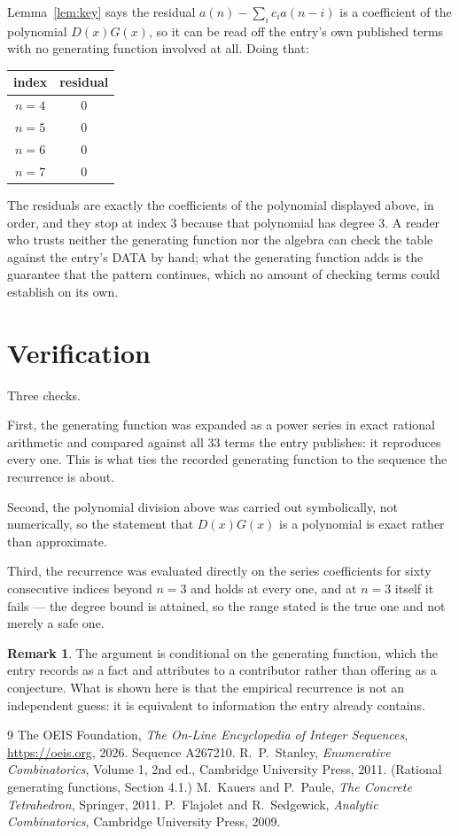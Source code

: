 \documentclass[11pt,a4paper]{article}
\theoremstyle{plain}
\theoremstyle{definition}
\newtheorem{remark}[theorem]{Remark}
\begin{document}
Lemma~\ref{lem:key} says the residual $a(n)-\sum_ic_ia(n-i)$ is a coefficient of the
polynomial $D(x)G(x)$, so it can be read off the entry's own published terms with no
generating function involved at all. Doing that:
\begin{center}
\begin{tabular}{cc}
index & residual \\ \hline
$n=4$ & $0$ \\
$n=5$ & $0$ \\
$n=6$ & $0$ \\
$n=7$ & $0$
\end{tabular}
\end{center}
The residuals are exactly the coefficients of the polynomial displayed above, in order, and
they stop at index $3$ because that polynomial has degree $3$. A reader who trusts
neither the generating function nor the algebra can check the table against the entry's DATA
by hand; what the generating function adds is the guarantee that the pattern continues, which
no amount of checking terms could establish on its own.

\section{Verification}

Three checks.

First, the generating function was expanded as a power series in exact rational arithmetic and
compared against all $33$ terms the entry publishes: it reproduces every one. This is
what ties the recorded generating function to the sequence the recurrence is about.

Second, the polynomial division above was carried out symbolically, not numerically, so the
statement that $D(x)G(x)$ is a polynomial is exact rather than approximate.

Third, the recurrence was evaluated directly on the series coefficients for sixty consecutive
indices beyond $n=3$ and holds at every one, and at $n=3$ itself it fails --- the
degree bound is attained, so the range stated is the true one and not merely a safe one.

\begin{remark}
The argument is conditional on the generating function, which the entry records as a fact and
attributes to a contributor rather than offering as a conjecture. What is shown here is that
the empirical recurrence is not an independent guess: it is equivalent to information the
entry already contains.
\end{remark}

\begin{thebibliography}{9}
 The OEIS Foundation, \emph{The On-Line Encyclopedia of Integer
Sequences}, \url{https://oeis.org}, 2026. Sequence A267210.
 R.~P.~Stanley, \emph{Enumerative Combinatorics}, Volume 1, 2nd ed.,
Cambridge University Press, 2011. (Rational generating functions, Section 4.1.)
 M.~Kauers and P.~Paule, \emph{The Concrete Tetrahedron}, Springer, 2011.
 P.~Flajolet and R.~Sedgewick, \emph{Analytic Combinatorics}, Cambridge
University Press, 2009.
\end{thebibliography}
\end{document}

